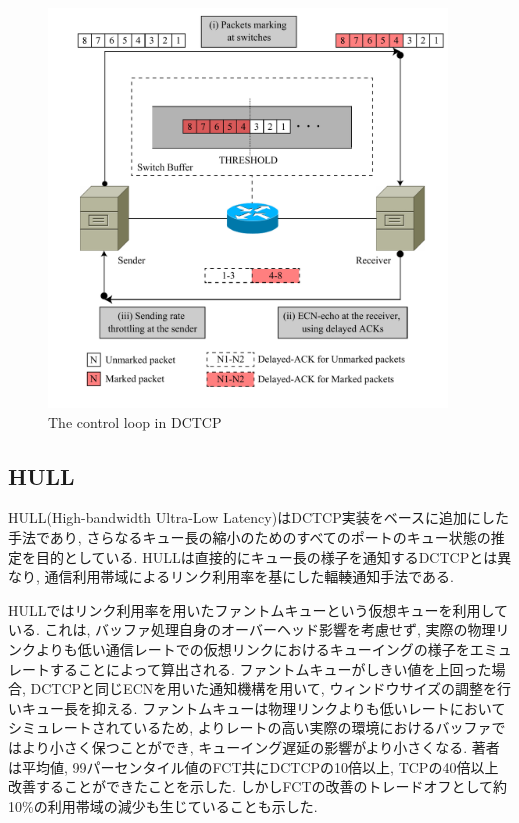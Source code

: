 \begin{figure}[t]
    \begin{center}
    \includegraphics[autoebb, width=300pt]{./img/DCTCP.pdf}
    \caption{The control loop in DCTCP}
    \label{fig:dctcp_control}
    \end{center}
\end{figure}

\subsection{HULL}
HULL(High-bandwidth Ultra-Low Latency)\cite{hull}はDCTCP実装をベースに追加にした手法であり,
さらなるキュー長の縮小のためのすべてのポートのキュー状態の推定を目的としている. 
HULLは直接的にキュー長の様子を通知するDCTCPとは異なり, 通信利用帯域によるリンク利用率を基にした輻輳通知手法である. 

HULLではリンク利用率を用いたファントムキューという仮想キューを利用している. 
これは, バッファ処理自身のオーバーヘッド影響を考慮せず,
実際の物理リンクよりも低い通信レートでの仮想リンクにおけるキューイングの様子をエミュレートすることによって算出される. 
ファントムキューがしきい値を上回った場合, DCTCPと同じECNを用いた通知機構を用いて, ウィンドウサイズの調整を行いキュー長を抑える. 
ファントムキューは物理リンクよりも低いレートにおいてシミュレートされているため, よりレートの高い実際の環境におけるバッファではより小さく保つことができ,
キューイング遅延の影響がより小さくなる. 
著者は平均値, 99パーセンタイル値のFCT共にDCTCPの10倍以上, TCPの40倍以上改善することができたことを示した. 
しかしFCTの改善のトレードオフとして約10\%の利用帯域の減少も生じていることも示した. 

